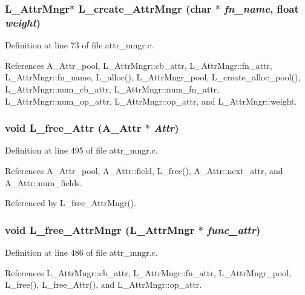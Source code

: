 \subsubsection{\setlength{\rightskip}{0pt plus 5cm}\bf{L\_\-Attr\-Mngr}$\ast$ L\_\-create\_\-Attr\-Mngr (char $\ast$ {\em fn\_\-name}, float {\em weight})}\label{attr__mngr_8h_88588be8b42498d527b5a3ac9d0f1645}




Definition at line 73 of file attr\_\-mngr.c.

References A\_\-Attr\_\-pool, L\_\-Attr\-Mngr::cb\_\-attr, L\_\-Attr\-Mngr::fn\_\-attr, L\_\-Attr\-Mngr::fn\_\-name, L\_\-alloc(), L\_\-Attr\-Mngr\_\-pool, L\_\-create\_\-alloc\_\-pool(), L\_\-Attr\-Mngr::num\_\-cb\_\-attr, L\_\-Attr\-Mngr::num\_\-fn\_\-attr, L\_\-Attr\-Mngr::num\_\-op\_\-attr, L\_\-Attr\-Mngr::op\_\-attr, and L\_\-Attr\-Mngr::weight.
\subsubsection{\setlength{\rightskip}{0pt plus 5cm}void L\_\-free\_\-Attr (\bf{A\_\-Attr} $\ast$ {\em Attr})}\label{attr__mngr_8h_56c92a355df9769616a247a121bd5924}




Definition at line 495 of file attr\_\-mngr.c.

References A\_\-Attr\_\-pool, A\_\-Attr::field, L\_\-free(), A\_\-Attr::next\_\-attr, and A\_\-Attr::num\_\-fields.

Referenced by L\_\-free\_\-Attr\-Mngr().
\subsubsection{\setlength{\rightskip}{0pt plus 5cm}void L\_\-free\_\-Attr\-Mngr (\bf{L\_\-Attr\-Mngr} $\ast$ {\em func\_\-attr})}\label{attr__mngr_8h_8fc357fe60c6e8bb81f20cf00d53ed53}




Definition at line 486 of file attr\_\-mngr.c.

References L\_\-Attr\-Mngr::cb\_\-attr, L\_\-Attr\-Mngr::fn\_\-attr, L\_\-Attr\-Mngr\_\-pool, L\_\-free(), L\_\-free\_\-Attr(), and L\_\-Attr\-Mngr::op\_\-attr.
